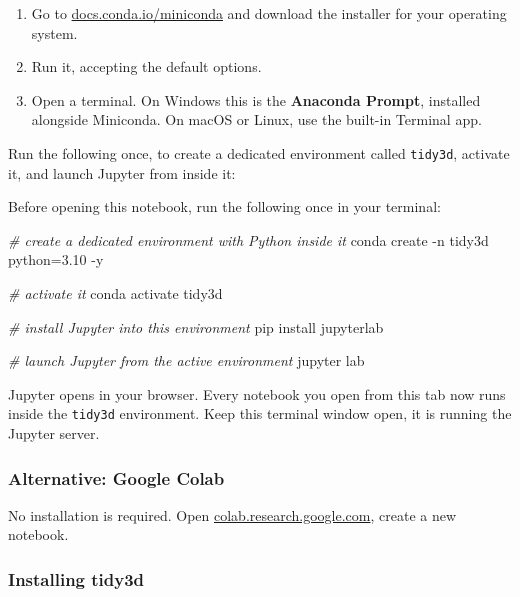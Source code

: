 \documentclass[11pt]{article}
\providecommand{\tightlist}{%
      \setlength{\itemsep}{0pt}\setlength{\parskip}{0pt}}
\newenvironment{Shaded}{}{}
\newcommand{\CommentTok}[1]{\textcolor[rgb]{0.38,0.63,0.69}{\textit{{#1}}}}
\newcommand{\NormalTok}[1]{{#1}}
\newcommand{\ExtensionTok}[1]{{#1}}
\newcommand{\AttributeTok}[1]{\textcolor[rgb]{0.49,0.56,0.16}{{#1}}}
\begin{document}
\begin{enumerate}
\def\labelenumi{\arabic{enumi}.}
\tightlist
\item
  Go to
  \href{https://docs.conda.io/en/latest/miniconda.html}{docs.conda.io/miniconda}
  and download the installer for your operating system.
\item
  Run it, accepting the default options.
\item
  Open a terminal. On Windows this is the \textbf{Anaconda Prompt},
  installed alongside Miniconda. On macOS or Linux, use the built-in
  Terminal app.
\end{enumerate}

Run the following once, to create a dedicated environment called
\texttt{tidy3d}, activate it, and launch Jupyter from inside it:

    Before opening this notebook, run the following once in your terminal:

\begin{Shaded}
\begin{Highlighting}[]
\CommentTok{\# create a dedicated environment with Python inside it}
\ExtensionTok{conda}\NormalTok{ create }\AttributeTok{{-}n}\NormalTok{ tidy3d python=3.10 }\AttributeTok{{-}y}

\CommentTok{\# activate it}
\ExtensionTok{conda}\NormalTok{ activate tidy3d}

\CommentTok{\# install Jupyter into this environment}
\ExtensionTok{pip}\NormalTok{ install jupyterlab}

\CommentTok{\# launch Jupyter from the active environment}
\ExtensionTok{jupyter}\NormalTok{ lab}
\end{Highlighting}
\end{Shaded}

    Jupyter opens in your browser. Every notebook you open from this tab now
runs inside the \texttt{tidy3d} environment. Keep this terminal window
open, it is running the Jupyter server.

    \subsubsection{Alternative: Google
Colab}\label{alternative-google-colab}

No installation is required. Open
\href{https://colab.research.google.com/}{colab.research.google.com},
create a new notebook.

    \subsubsection{Installing tidy3d}\label{installing-tidy3d}
\end{document}
